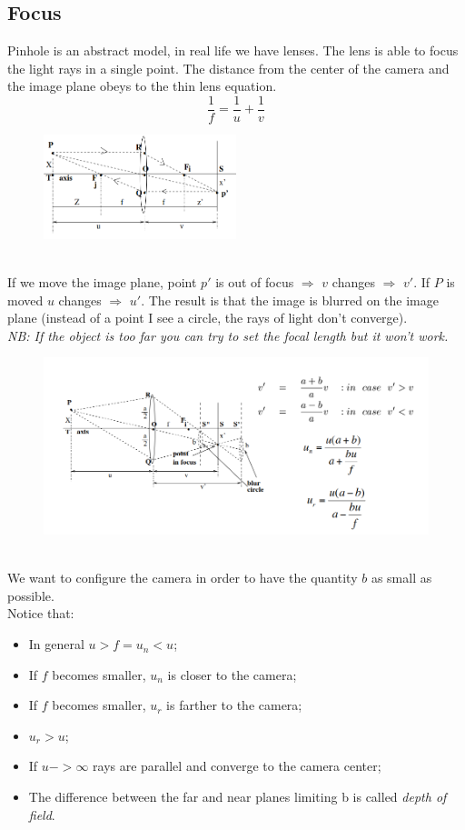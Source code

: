 \subsection{Focus}
Pinhole is an abstract model, in real life we have lenses. The lens is able to focus the light rays in a single point. The distance from the center of the camera and the image plane obeys to the thin lens equation.
\[
    \frac{1}{f} = \frac{1}{u} + \frac{1}{v}
\]
\begin{figure}[h]
    \centering
    \includegraphics[width=0.5\textwidth]{Figures/ThinLenses.png}
\end{figure}
\\If we move the image plane, point $p'$ is out of focus $\Rightarrow$ $v$ changes $\Rightarrow$ $v'$.
If $P$ is moved $u$ changes $\Rightarrow$ $u'$.
The result is that the image is blurred on the image plane (instead of a point I see a circle, the rays of light don't converge).
\\\textit{NB: If the object is too far you can try to set the focal length but it won't work.}
\begin{figure}[h]
    \centering
    \includegraphics[width=1\textwidth]{Figures/Focus.png}
\end{figure}
\\We want to configure the camera in order to have the quantity $b$ as small as possible.
\\Notice that:
\begin{itemize}
    \item In general $u > f = u_n < u$;
    \item If $f$ becomes smaller, $u_n$ is closer to the camera;
    \item If $f$ becomes smaller, $u_r$ is farther to the camera;
    \item $u_r > u$;
    \item If $u -> \infty$ rays are parallel and converge to the camera center;
    \item The difference between the far and near planes limiting b is called \textit{depth of field}. 
\end{itemize}
